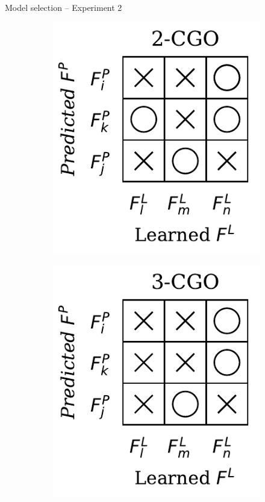 \begin{frame}{Model selection -- Experiment 2}
\begin{figure}[H]
\begin{subfigure}[b]{0.17\textwidth}
        \end{subfigure}
        \hfill
        \begin{subfigure}[b]{0.17\textwidth}
            \includegraphics[width=\textwidth]{img/msel/_2-CGO.pdf}
        \end{subfigure}
        \hfill
        \begin{subfigure}[b]{0.17\textwidth}
            \includegraphics[width=\textwidth]{img/msel/_3-CGO.pdf}

\end{subfigure}
\end{figure}
\end{frame}

